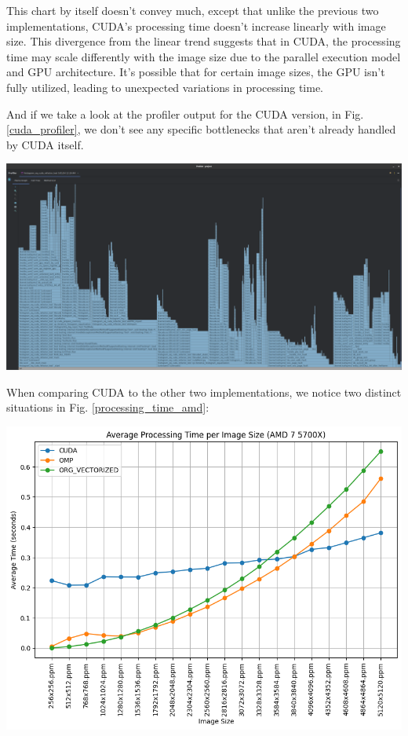 \documentclass[sigconf]{acmart}
\begin{document}
This chart by itself doesn't convey much, except that unlike the previous two implementations, CUDA's processing time doesn't increase linearly with image size. This divergence from the linear trend suggests that in CUDA, the processing time may scale differently with the image size due to the parallel execution model and GPU architecture. It's possible that for certain image sizes, the GPU isn't fully utilized, leading to unexpected variations in processing time.

And if we take a look at the profiler output for the CUDA version, in Fig. \ref{cuda_profiler}, we don't see any specific bottlenecks that aren't already handled by CUDA itself.


\begin{center}
    \includegraphics[width=0.8\linewidth]{vizs/cuda_profiler.png}
    \label{cuda_profiler}
\end{center}

When comparing CUDA to the other two implementations, we notice two distinct situations in Fig. \ref{processing_time_amd}:

\begin{center}
    \includegraphics[width=0.8\linewidth]{vizs/amd_output.png}
    \label{processing_time_amd}
\end{center}
\end{document}
